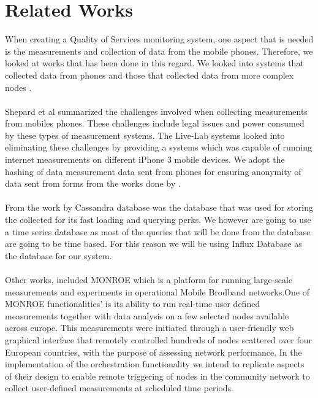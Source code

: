 \section{Related Works}
When creating a Quality of Services monitoring system, one aspect that is needed is the measurements and collection of data from the mobile phones. Therefore, we looked at works that has been done in this regard. We looked into systems that collected data from phones and those that collected data from more complex nodes \cite{7523537, Shepard:2011:LMW:1925019.1925023}. 
\paragraph{}
Shepard et al \cite{Shepard:2011:LMW:1925019.1925023} summarized the challenges involved when collecting measurements from mobiles phones. These challenges include legal issues and power consumed by these types of measurement systems. The Live-Lab systems \cite{Shepard:2011:LMW:1925019.1925023} looked into eliminating these challenges by providing a systems which was capable of running internet measurements on different iPhone 3 mobile devices. We adopt the hashing of data measurement data sent from phones for ensuring anonymity of data sent from forms from the works done by \cite{Shepard:2011:LMW:1925019.1925023}.
\paragraph{}
From the work by \cite{7523537,8255998} Cassandra database was the database that was used for storing the collected for its fast loading and querying perks. We however are going to use a time series database as most of the queries that will be done from the database are going to be time based. For this reason we will be using Influx Database as the database for our system.

\paragraph{}
Other works, included MONROE which is a platform for running large-scale measurements and experiments in operational Mobile Brodband networks\cite{7523537}.One of MONROE functionalities' is its ability to run real-time user defined measurements together with data analysis on a few selected nodes available across europe\cite{7523537}. This measurements were initiated through a user-friendly web graphical interface that remotely controlled hundreds of nodes scattered over four European countries, with the purpose of assessing network performance\cite{7523537}. In the implementation of the orchestration functionality we intend to replicate aspects of their design to enable remote triggering of nodes in the community network to collect user-defined measurements at scheduled time periods. 

